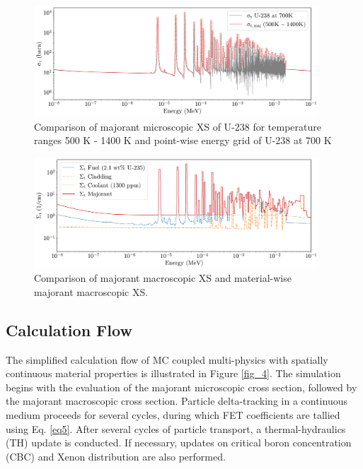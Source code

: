 \begin{figure}
    \centering
    \includegraphics[width=0.95\textwidth]{figs/maj.pdf}
    \caption[Comparison of majorant microscopic XS of U-238]{Comparison of majorant microscopic XS of U-238 for temperature ranges 500 K - 1400 K and point-wise energy grid of U-238 at 700 K}
    \label{fig_2}
\end{figure}
\begin{figure}
    \centering
    \includegraphics[width=0.95\textwidth]{figs/maj_mat.pdf}
    \caption[Comparison of majorant macroscopic XS]{Comparison of majorant macroscopic XS and material-wise majorant macroscopic XS.}
    \label{fig_3}
\end{figure}

\subsection{Calculation Flow} \label{sec25}

The simplified calculation flow of MC coupled multi-physics with spatially continuous material properties is illustrated in Figure \ref{fig_4}. The simulation begins with the evaluation of the majorant microscopic cross section, followed by the majorant macroscopic cross section. Particle delta-tracking in a continuous medium proceeds for several cycles, during which FET coefficients are tallied using Eq. \ref{eq5}. After several cycles of particle transport, a thermal-hydraulics (TH) update is conducted. If necessary, updates on critical boron concentration (CBC) and Xenon distribution are also performed.

